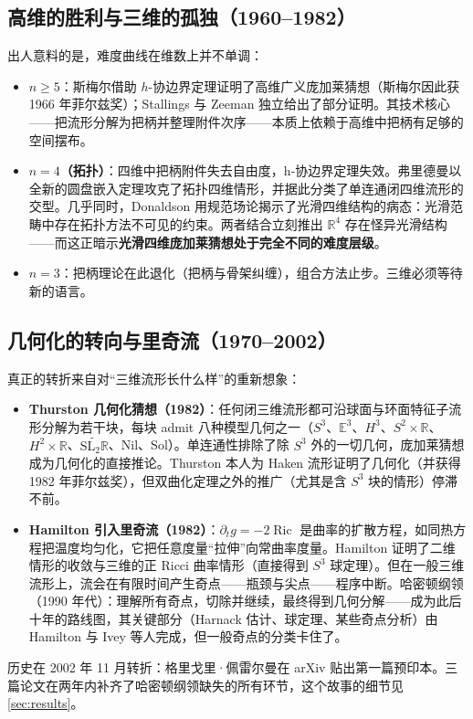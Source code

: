 \subsection{高维的胜利与三维的孤独（1960--1982）}

出人意料的是，难度曲线在维数上并不单调：

\begin{itemize}
    \item \textbf{$n \geq 5$}：斯梅尔借助 $h$-协边界定理\cite{smale1961}证明了高维广义庞加莱猜想（斯梅尔因此获 1966 年菲尔兹奖）；Stallings 与 Zeeman 独立给出了部分证明。其技术核心——把流形分解为把柄并整理附件次序——本质上依赖于高维中把柄有足够的空间摆布。
    \item \textbf{$n = 4$（拓扑）}：四维中把柄附件失去自由度，h-协边界定理失效。弗里德曼以全新的圆盘嵌入定理攻克了拓扑四维情形\cite{freedman1982}，并据此分类了单连通闭四维流形的交型。几乎同时，Donaldson 用规范场论揭示了光滑四维结构的病态\cite{donaldson1983}：光滑范畴中存在拓扑方法不可见的约束。两者结合立刻推出 $\mathbb{R}^4$ 存在怪异光滑结构——而这正暗示\textbf{光滑四维庞加莱猜想处于完全不同的难度层级}。
    \item \textbf{$n = 3$}：把柄理论在此退化（把柄与骨架纠缠），组合方法止步。三维必须等待新的语言。
\end{itemize}

\subsection{几何化的转向与里奇流（1970--2002）}

真正的转折来自对“三维流形长什么样”的重新想象：

\begin{itemize}
    \item \textbf{Thurston 几何化猜想（1982）}\cite{thurston1982}：任何闭三维流形都可沿球面与环面特征子流形分解为若干块，每块 admit 八种模型几何之一（$S^3$、$\mathbb{E}^3$、$H^3$、$S^2 \times \mathbb{R}$、$H^2 \times \mathbb{R}$、$\widetilde{\mathrm{SL}_2\mathbb{R}}$、Nil、Sol）。单连通性排除了除 $S^3$ 外的一切几何，庞加莱猜想成为几何化的直接推论。Thurston 本人为 Haken 流形证明了几何化（并获得 1982 年菲尔兹奖），但双曲化定理之外的推广（尤其是含 $S^3$ 块的情形）停滞不前。
    \item \textbf{Hamilton 引入里奇流（1982）}\cite{hamilton1982}：$\partial_t g = -2\operatorname{Ric}$ 是曲率的扩散方程，如同热方程把温度均匀化，它把任意度量“拉伸”向常曲率度量。Hamilton 证明了二维情形的收敛与三维的正 Ricci 曲率情形（直接得到 $S^3$ 球定理）。但在一般三维流形上，流会在有限时间产生奇点——瓶颈与尖点——程序中断。哈密顿纲领（1990 年代）：理解所有奇点，切除并继续，最终得到几何分解——成为此后十年的路线图，其关键部分（Harnack 估计、球定理、某些奇点分析）由 Hamilton 与 Ivey 等人完成，但一般奇点的分类卡住了。
\end{itemize}

历史在 2002 年 11 月转折：格里戈里·佩雷尔曼在 arXiv 贴出第一篇预印本。三篇论文\cite{perelman2002entropy,perelman2003surgery,perelman2003extinction}在两年内补齐了哈密顿纲领缺失的所有环节，这个故事的细节见\cref{sec:results}。

